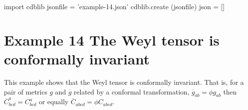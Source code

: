 \documentclass[12pt]{cdblatex}
\begin{document}
\bgroup
{}
\begin{cadabra}
   import cdblib
   jsonfile = 'example-14.json'
   cdblib.create (jsonfile)
   json = []
\end{cadabra}
\egroup

\clearpage

\section*{Example 14 The Weyl tensor is conformally invariant}

This example shows that the Weyl tensor is conformally invariant. That is, for a pair of
metrics $g$ and $\overline{g}$ related by a conformal transformation,
$\overline{g}_{a b} = \phi g_{a b}$ then $\overline{C}^{a}_{b c d} = C^{a}_{b c d}$
or equally $\overline{C}_{a b c d} = \phi C_{a b c d}$.
\end{document}
